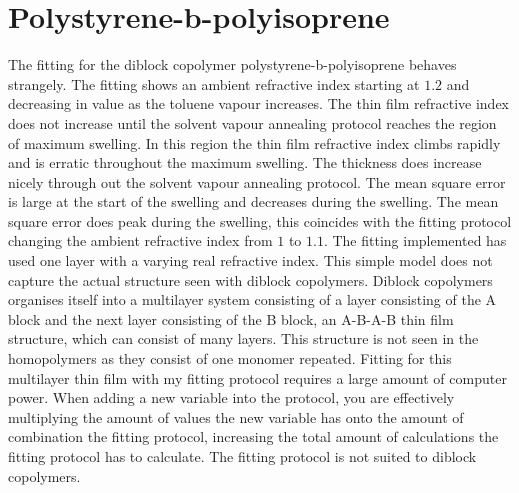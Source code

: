 \documentclass[MasterThesisMain.tex]{subfiles}
\begin{document}
\section{Polystyrene-b-polyisoprene}
The fitting for the diblock copolymer polystyrene-b-polyisoprene behaves strangely. The fitting shows an ambient refractive index starting at $1.2$ and decreasing in value as the toluene vapour increases. The thin film refractive index does not increase until the solvent vapour annealing protocol reaches the region of maximum swelling. In this region the thin film refractive index climbs rapidly and is erratic throughout the maximum swelling. The thickness does increase nicely through out the solvent vapour annealing protocol. The mean square error is large at the start of the swelling and decreases during the swelling. The mean square error does peak during the swelling, this coincides with the fitting protocol changing the ambient refractive index from $1$ to $1.1$. The fitting implemented has used one layer with a varying real refractive index. This simple model does not capture the actual structure seen with diblock copolymers. Diblock copolymers organises itself into a multilayer system consisting of a layer consisting of the A block and the next layer consisting of the B block, an A-B-A-B thin film structure, which can consist of many layers. This structure is not seen in the homopolymers as they consist of one monomer repeated. Fitting for this multilayer thin film with my fitting protocol requires a large amount of computer power. When adding a new variable into the protocol, you are effectively multiplying the amount of values the new variable has onto the amount of combination the fitting protocol, increasing the total amount of calculations the fitting protocol has to calculate. The fitting protocol is not suited to diblock copolymers.     
\end{document}
